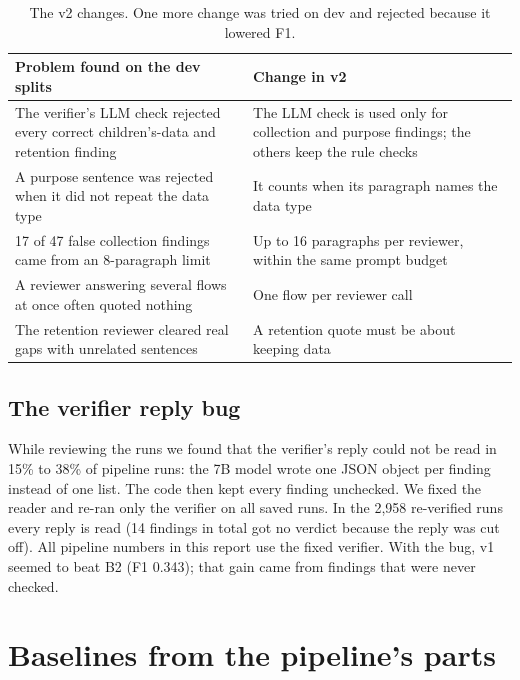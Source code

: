 \documentclass[11pt,a4paper]{article}
\newcommand{\rowline}{\specialrule{0.2pt}{3pt}{3pt}}
\begin{document}
\begin{table}[H]
\centering
\small
\begin{tabular}{L{7.4cm}L{7.4cm}}
\toprule
Problem found on the dev splits & Change in v2 \\
\midrule
The verifier's LLM check rejected every correct children's-data and retention finding &
The LLM check is used only for collection and purpose findings; the others keep the rule
checks \\ \rowline
A purpose sentence was rejected when it did not repeat the data type &
It counts when its paragraph names the data type \\ \rowline
17 of 47 false collection findings came from an 8-paragraph limit &
Up to 16 paragraphs per reviewer, within the same prompt budget \\ \rowline
A reviewer answering several flows at once often quoted nothing &
One flow per reviewer call \\ \rowline
The retention reviewer cleared real gaps with unrelated sentences &
A retention quote must be about keeping data \\
\bottomrule
\end{tabular}
\caption{The v2 changes. One more change was tried on dev and rejected because it lowered F1.}
\end{table}

\subsection{The verifier reply bug}
\label{sec:bug}

While reviewing the runs we found that the verifier's reply could not be read in 15\% to 38\% of
pipeline runs: the 7B model wrote one JSON object per finding instead of one list. The code then
kept every finding unchecked. We fixed the reader and re-ran only the verifier on all saved runs.
In the 2,958 re-verified runs every reply is read (14 findings in total got no verdict because the
reply was cut off). All pipeline numbers in this report use the fixed verifier. With the bug, v1
seemed to beat B2 (F1 0.343); that gain came from findings that were never checked.

\section{Baselines from the pipeline's parts}
\label{sec:parts}
\end{document}
